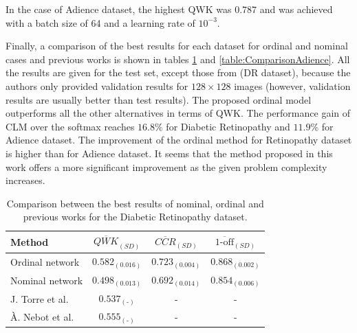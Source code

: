 \documentclass[journal]{IEEEtran}
\begin{document}
	In the case of Adience dataset, the highest QWK was $0.787$ and was achieved with a batch size of 64 and a learning rate of $10^{-3}$.

	Finally, a comparison of the best results for each dataset for ordinal and nominal cases and previous works is shown in tables \ref{table:ComparisonDR} and \ref{table:ComparisonAdience}. All the results are given for the test set, except those from \cite{de2018weighted} (DR dataset), because the authors only provided validation results for $128\times 128$ images (however, validation results are usually better than test results). The proposed ordinal model outperforms all the other alternatives in terms of QWK. The performance gain of CLM over the softmax reaches $16.8\%$ for Diabetic Retinopathy and $11.9\%$ for Adience dataset. The improvement of the ordinal method for Retinopathy dataset is higher than for Adience dataset. It seems that the method proposed in this work offers a more significant improvement as the given problem complexity increases.
	
	\begin{table}[!t]
		\caption{Comparison between the best results of nominal, ordinal and previous works for the Diabetic Retinopathy dataset.}
		\label{table:ComparisonDR}
		\scriptsize
		\centering
		\def\arraystretch{1.3}
		\begin{tabular}{lccc}
			\hline
			\hline
			Method                                   & $\overline{QWK}_{(SD)}$ & $\overline{CCR}_{(SD)}$ & $\overline{\text{1-off}}_{(SD)}$ \\ \hline
			Ordinal network                          &    $0.582_{(0.016)}$    &    $0.723_{(0.004)}$    &        $0.868_{(0.002)}$         \\
			Nominal network                          &    $0.498_{(0.013)}$    &    $0.692_{(0.014)}$    &        $0.854_{(0.006)}$         \\
			J. Torre et al. \cite{de2018weighted}    &  $0.537_{(\text{-})}$   &            -            &                -                 \\
			À. Nebot et al. \cite{nebot2016diabetic} &  $0.555_{(\text{-})}$   &            -            &                -					\\
			\hline
			\hline
		\end{tabular}
	\end{table}
	
\end{document}
